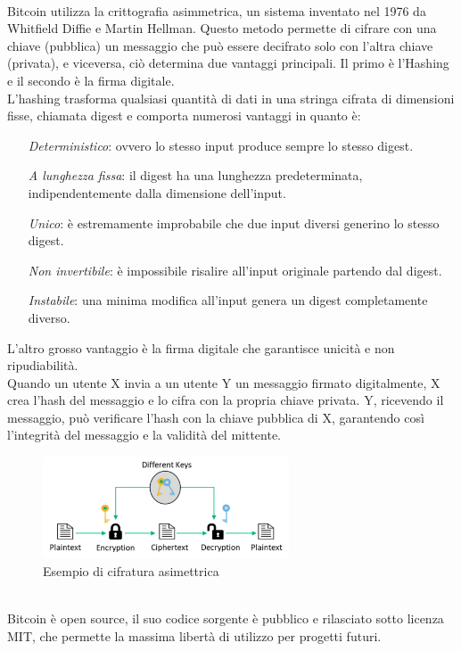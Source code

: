 \\Bitcoin utilizza la crittografia asimmetrica, un sistema inventato nel 1976 da Whitfield Diffie e Martin Hellman. Questo metodo permette di cifrare con una chiave (pubblica) un messaggio che può essere decifrato solo con l’altra chiave (privata), e viceversa, ciò determina due vantaggi principali.
Il primo è l'Hashing e il secondo è la firma digitale.
\\L'hashing trasforma qualsiasi quantità di dati in una stringa cifrata di dimensioni fisse, chiamata digest e comporta numerosi vantaggi in quanto è: 
\begin{itemize}
    \item[\textit{Deterministico}:] ovvero lo stesso input produce sempre lo stesso digest.
    \item [\textit{A lunghezza fissa}:] il digest ha una lunghezza predeterminata, indipendentemente dalla dimensione dell’input.
    \item [\textit{Unico}:] è estremamente improbabile che due input diversi generino lo stesso digest.
    \item [\textit{Non invertibile}:] è impossibile risalire all’input originale partendo dal digest.
    \item [\textit{Instabile}:] una minima modifica all’input genera un digest completamente diverso.
\end{itemize}
L'altro grosso vantaggio è la firma digitale che garantisce unicità e non ripudiabilità. 
\\Quando un utente X invia a un utente Y un messaggio firmato digitalmente, X crea l’hash del messaggio e lo cifra con la propria chiave privata. Y, ricevendo il messaggio, può verificare l’hash con la chiave pubblica di X, garantendo così l’integrità del messaggio e la validità del mittente.
\begin{figure}[h]
\centering
\includegraphics[width=0.65\textwidth]{Immagini/cifratura asimmetrica.png}
\caption{Esempio di cifratura asimettrica}
\end{figure}
\\
Bitcoin è open source, il suo codice sorgente è pubblico e rilasciato sotto licenza MIT, che permette la massima libertà di utilizzo per progetti futuri.
